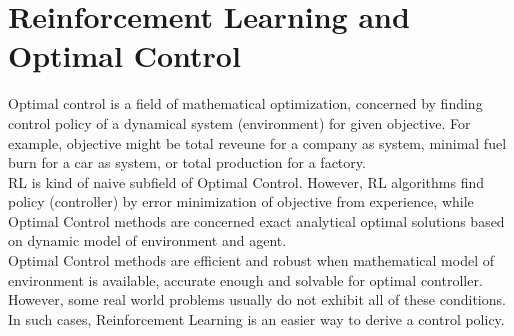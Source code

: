 \section{Reinforcement Learning and Optimal Control}
\label{sec:rl_and_control}
Optimal control is a field of mathematical optimization, concerned by  finding control policy of a dynamical system (environment) for given objective. For example, objective might be total reveune for a company as system, minimal fuel burn for a car as system, or total production for a factory. \\
RL is kind of naive subfield of Optimal Control. However, RL algorithms find policy (controller) by error minimization of objective from experience, while Optimal Control methods are concerned exact analytical optimal solutions based on dynamic model of environment and agent. \\
Optimal Control methods are efficient and robust when mathematical model of environment is available, accurate enough and solvable for optimal controller. However, some real world problems usually do not exhibit all of these conditions. In such cases, Reinforcement Learning is an easier way to derive a control policy.
